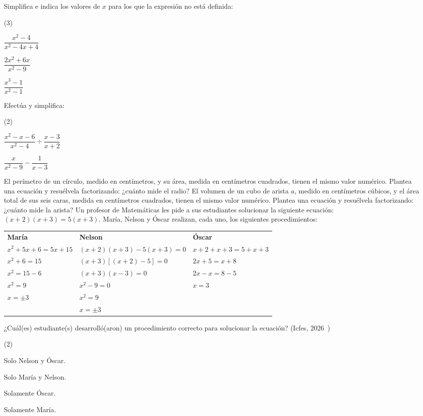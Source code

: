 \documentclass[11pt]{article}
\begin{document}
\begin{preguntas}
\pregunta Simplifica e indica los valores de $x$ para los que la expresión
no está definida:
\begin{opciones*}(3)
  \item $\dfrac{x^2 - 4}{x^2 - 4x + 4}$
  \item $\dfrac{2x^2 + 6x}{x^2 - 9}$
  \item $\dfrac{x^3 - 1}{x^2 - 1}$
\end{opciones*}
\espacio{3.5cm}
\pregunta Efectúa y simplifica:
\begin{opciones*}(2)
  \item $\dfrac{x^2 - x - 6}{x^2 - 4} \div \dfrac{x - 3}{x + 2}$
  \item $\dfrac{x}{x^2 - 9} - \dfrac{1}{x - 3}$
\end{opciones*}
\espacio{3.5cm}
\pregunta El perímetro de un círculo, medido en centímetros, y su área,
medida en centímetros cuadrados, tienen el mismo valor numérico. Plantea una
ecuación y resuélvela factorizando: ¿cuánto mide el radio?
\espacio{3cm}
\pregunta El volumen de un cubo de arista $a$, medido en centímetros cúbicos,
y el área total de sus seis caras, medida en centímetros cuadrados, tienen el
mismo valor numérico. Plantea una ecuación y resuélvela factorizando:
¿cuánto mide la arista?
\espacio{3cm}
\pregunta Un profesor de Matemáticas les pide a sus estudiantes solucionar la
siguiente ecuación: $(x + 2)(x + 3) = 5(x + 3)$. María, Nelson y Óscar
realizan, cada uno, los siguientes procedimientos:
\begin{center}
\small
\begin{tabular}{lll}
\textbf{María} & \textbf{Nelson} & \textbf{Óscar} \\
$x^2 + 5x + 6 = 5x + 15$ & $(x + 2)(x + 3) - 5(x + 3) = 0$ & $x + 2 + x + 3 = 5 + x + 3$ \\
$x^2 + 6 = 15$ & $(x + 3)[(x + 2) - 5] = 0$ & $2x + 5 = x + 8$ \\
$x^2 = 15 - 6$ & $(x + 3)(x - 3) = 0$ & $2x - x = 8 - 5$ \\
$x^2 = 9$ & $x^2 - 9 = 0$ & $x = 3$ \\
$x = \pm 3$ & $x^2 = 9$ & \\
 & $x = \pm 3$ & \\
\end{tabular}
\end{center}
¿Cuál(es) estudiante(s) desarrolló(aron) un procedimiento correcto para
solucionar la ecuación? {\small (Icfes, 2026~\cite{icfes})}
\begin{opciones*}(2)
  \item Solo Nelson y Óscar.
  \item Solo María y Nelson.
  \item Solamente Óscar.
  \item Solamente María.
\end{opciones*}
\end{preguntas}
\end{document}
